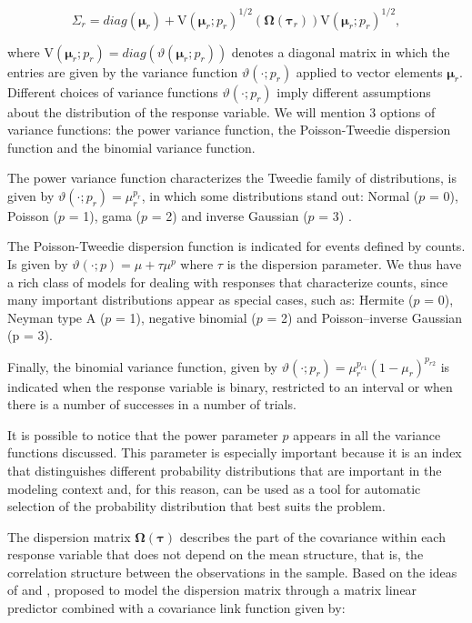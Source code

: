 \documentclass[article]{jss}\usepackage[]{graphicx}\usepackage[]{xcolor}
\begin{document}
$$
\Sigma_r = diag(\boldsymbol{\mu}_r)+ \mathrm{V}\left(\boldsymbol{\mu}_r; p_r\right)^{1/2}(\boldsymbol{\Omega}\left(\boldsymbol{\tau}_r\right))\mathrm{V}\left(\boldsymbol{\mu}_r; p_r\right)^{1/2},
$$

\noindent where $\mathrm{V}\left(\boldsymbol{\mu}_r; p_r\right) = diag(\vartheta(\boldsymbol{\mu}_r; p_r))$ denotes a diagonal matrix in which the entries are given by the variance function $\vartheta(\cdot; p_r)$ applied to vector elements $\boldsymbol{\mu}_r$. Different choices of variance functions $\vartheta(\cdot; p_r)$ imply different assumptions about the distribution of the response variable. We will mention 3 options of variance functions: the power variance function, the Poisson-Tweedie dispersion function and the binomial variance function.

The power variance function characterizes the Tweedie family of distributions, is given by $\vartheta\left(\cdot; p_r\right) = \mu^{p_r}_r$, in which some distributions stand out: Normal ($p$ = 0), Poisson ($p$ = 1), gama ($p$ = 2) and  inverse Gaussian ($p$ = 3) \citep{Jorgensen87, Jorgensen97}. 

The Poisson-Tweedie dispersion function \citep{Jorgensen15} is indicated for events defined by counts. Is given by $\vartheta\left(\cdot; p\right) = \mu + \tau\mu^p$ where $\tau$ is the dispersion parameter. We thus have a rich class of models for dealing with responses that characterize counts, since many important distributions appear as special cases, such as: Hermite ($p$ = 0), Neyman type A ($p$ = 1), negative binomial ($p$ = 2) and Poisson–inverse Gaussian (p = $3$).

Finally, the binomial variance function, given by $\vartheta\left(\cdot; p_r\right) = \mu^{p_{r1}}_r(1 - \mu_r)^{p_{r2}}$ is indicated when the response variable is binary, restricted to an interval or when there is a number of successes in a number of trials.

It is possible to notice that the power parameter $p$ appears in all the variance functions discussed. This parameter is especially important because it is an index that distinguishes different probability distributions that are important in the modeling context and, for this reason, can be used as a tool for automatic selection of the probability distribution that best suits the problem.

The dispersion matrix $\boldsymbol{\Omega({\tau})}$ describes the part of the covariance within each response variable that does not depend on the mean structure, that is, the correlation structure between the observations in the sample. Based on the ideas of \citet{Anderson73} and \citet{Pourahmadi00}, \citet{Bonat16} proposed to model the dispersion matrix through a matrix linear predictor combined with a covariance link function given by:
\end{document}
